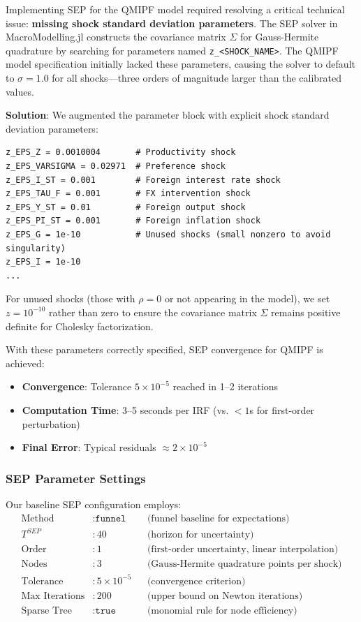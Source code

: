 \documentclass[12pt]{article}
\begin{document}
Implementing SEP for the QMIPF model required resolving a critical technical issue: \textbf{missing shock standard deviation parameters}. The SEP solver in MacroModelling.jl constructs the covariance matrix $\Sigma$ for Gauss-Hermite quadrature by searching for parameters named \texttt{z\_<SHOCK\_NAME>}. The QMIPF model specification initially lacked these parameters, causing the solver to default to $\sigma = 1.0$ for all shocks---three orders of magnitude larger than the calibrated values.

\textbf{Solution}: We augmented the parameter block with explicit shock standard deviation parameters:
\begin{verbatim}
z_EPS_Z = 0.0010004       # Productivity shock
z_EPS_VARSIGMA = 0.02971  # Preference shock
z_EPS_I_ST = 0.001        # Foreign interest rate shock
z_EPS_TAU_F = 0.001       # FX intervention shock
z_EPS_Y_ST = 0.01         # Foreign output shock
z_EPS_PI_ST = 0.001       # Foreign inflation shock
z_EPS_G = 1e-10           # Unused shocks (small nonzero to avoid singularity)
z_EPS_I = 1e-10
...
\end{verbatim}
For unused shocks (those with $\rho = 0$ or not appearing in the model), we set $z = 10^{-10}$ rather than zero to ensure the covariance matrix $\Sigma$ remains positive definite for Cholesky factorization.

With these parameters correctly specified, SEP convergence for QMIPF is achieved:
\begin{itemize}
\item \textbf{Convergence}: Tolerance $5 \times 10^{-5}$ reached in 1--2 iterations
\item \textbf{Computation Time}: 3--5 seconds per IRF (vs. $<1$s for first-order perturbation)
\item \textbf{Final Error}: Typical residuals $\approx 2 \times 10^{-5}$
\end{itemize}

\subsubsection{SEP Parameter Settings}

Our baseline SEP configuration employs:
\begin{align*}
\text{Method} &: \texttt{funnel} && \text{(funnel baseline for expectations)} \\
T^{SEP} &: 40 && \text{(horizon for uncertainty)} \\
\text{Order} &: 1 && \text{(first-order uncertainty, linear interpolation)} \\
\text{Nodes} &: 3 && \text{(Gauss-Hermite quadrature points per shock)} \\
\text{Tolerance} &: 5 \times 10^{-5} && \text{(convergence criterion)} \\
\text{Max Iterations} &: 200 && \text{(upper bound on Newton iterations)} \\
\text{Sparse Tree} &: \texttt{true} && \text{(monomial rule for node efficiency)}
\end{align*}
\end{document}
